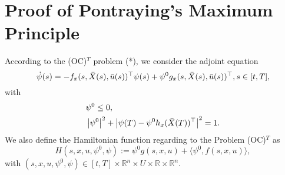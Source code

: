 \section{Proof of Pontraying's Maximum Principle} 

According to the (OC)$^{T}$ problem (*), we consider the adjoint equation 
\begin{equation}\label{psi_der}
    \Dot{\psi}(s) = - f_{x}(s, \Bar{X}(s), \Bar{u}(s))^{\top}\psi(s) + %
        \psi^{0}g_{x}(s, \Bar{X}(s), \Bar{u}(s))^{\top}, s \in [t,T],
\end{equation}
with
\begin{align*}
    &\psi^{0} \leq 0, \\
    &\left\lvert\psi^{0}\right\rvert^{2} + \left\lvert\psi(T) - \psi^{0}h_{x}(\Bar{X}(T))^{\top}\right\rvert^{2}=1.
\end{align*}
We also define the Hamiltonian function regarding to the Problem (OC)$^{T}$ as
\begin{equation}
    H(s, x, u, \psi^{0}, \psi) := \psi^{0}g(s,x,u) + \langle \psi^{0}, f(s,x,u) \rangle,
\end{equation}
with $(s, x, u, \psi^{0}, \psi) \in [t,T]\times \mathbb{R}^{n}\times U \times %
        \mathbb{R}\times \mathbb{R}^{n}$.

